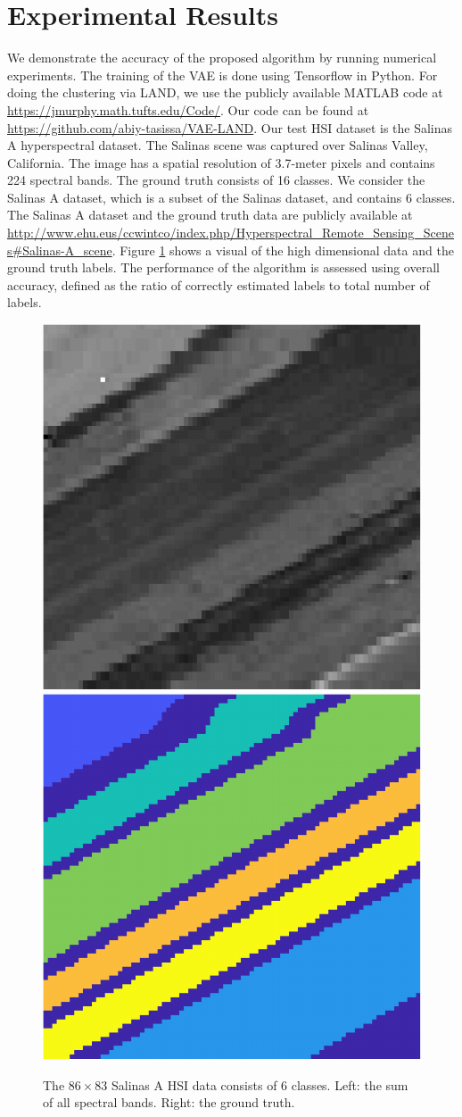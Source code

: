 \documentclass{article}
\begin{document}
\section{Experimental Results}
\label{sec:Experiments}
We demonstrate the accuracy of the proposed algorithm by running numerical experiments. The training of the VAE is done using Tensorflow in Python. For doing the clustering via LAND, we use the publicly available MATLAB code 
at  \url{https://jmurphy.math.tufts.edu/Code/}. Our code can be found at \url{https://github.com/abiy-tasissa/VAE-LAND}. Our test HSI dataset is the Salinas A hyperspectral dataset. The Salinas scene was captured over Salinas Valley, California. The image has a spatial resolution of 3.7-meter pixels and contains 224 spectral bands. The ground truth consists of 16 classes. We consider the Salinas A dataset, which is a subset of the Salinas dataset, and contains 6 classes. The Salinas A dataset and the ground truth data are publicly available at \url{http://www.ehu.eus/ccwintco/index.php/Hyperspectral_Remote_Sensing_Scenes#Salinas-A_scene}. Figure \ref{fig:SalinasA} shows a visual of the high dimensional data and the ground truth labels. The performance of the algorithm is assessed using overall accuracy, defined as the ratio of correctly estimated labels to total number of labels. 

\begin{figure}[htb]
\includegraphics[width=.23\textwidth,clip]{Images/SalinasA_BandSum-crop.pdf}
\includegraphics[width=.23\textwidth,clip]{Images/SalinasA_GT-crop.pdf}
\caption{\small{The $86\times 83$ Salinas A HSI data consists of 6 classes.  Left: the sum of all spectral bands.  Right: the ground truth.}}
\label{fig:SalinasA}
\end{figure}
\end{document}
